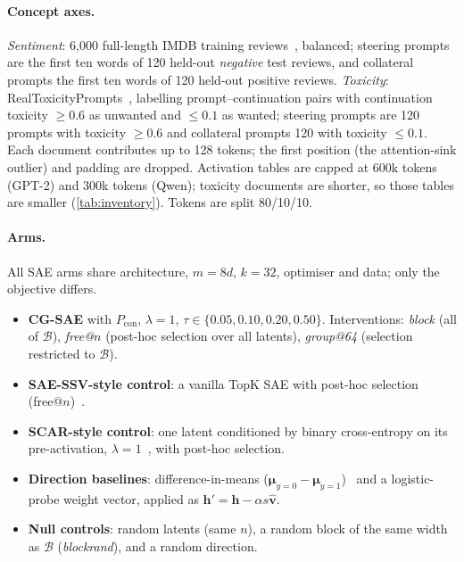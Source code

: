 \documentclass[11pt,a4paper]{article}
\theoremstyle{remark}
\newcommand{\h}{\mathbf{h}}
\newcommand{\Bset}{\mathcal{B}}
\begin{document}
\paragraph{Concept axes.}
\emph{Sentiment}: 6{,}000 full-length IMDB training reviews~\citep{maas2011imdb}, balanced;
steering prompts are the first ten words of 120 held-out \emph{negative} test reviews, and
collateral prompts the first ten words of 120 held-out positive reviews. \emph{Toxicity}:
RealToxicityPrompts~\citep{gehman2020rtp}, labelling prompt--continuation pairs with continuation
toxicity $\ge0.6$ as unwanted and $\le0.1$ as wanted; steering prompts are 120 prompts with
toxicity $\ge0.6$ and collateral prompts 120 with toxicity $\le0.1$. Each document contributes
up to 128 tokens; the first position (the attention-sink outlier) and padding are dropped.
Activation tables are capped at 600k tokens (GPT-2) and 300k tokens (Qwen); toxicity documents
are shorter, so those tables are smaller (\cref{tab:inventory}). Tokens are split 80/10/10.

\paragraph{Arms.}
All SAE arms share architecture, $m=8d$, $k=32$, optimiser and data; only the objective
differs.
\begin{itemize}
  \item \textbf{CG-SAE} with $P_{\mathrm{con}}$, $\lambda=1$, $\tau\in\{0.05,0.10,0.20,0.50\}$.
        Interventions: \emph{block} (all of $\Bset$), \emph{free@$n$} (post-hoc selection over
        all latents), \emph{group@64} (selection restricted to $\Bset$).
  \item \textbf{SAE-SSV-style control}: a vanilla TopK SAE with post-hoc selection
        (free@$n$)~\citep{he2025saessv}.
  \item \textbf{SCAR-style control}: one latent conditioned by binary cross-entropy on its
        pre-activation, $\lambda=1$~\citep{harle2024scar}, with post-hoc selection.
  \item \textbf{Direction baselines}: difference-in-means
        ($\boldsymbol\mu_{y=0}-\boldsymbol\mu_{y=1}$)~\citep{rimsky2024caa,arditi2024refusal} and
        a logistic-probe weight vector, applied as $\h'=\h-\alpha s\hat{\mathbf v}$.
  \item \textbf{Null controls}: random latents (same $n$), a random block of the same width as
        $\Bset$ (\emph{blockrand}), and a random direction.
\end{itemize}
\end{document}
